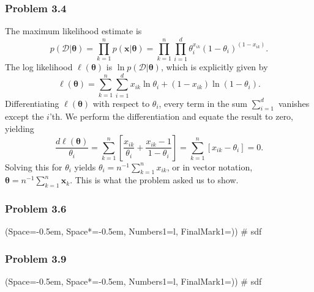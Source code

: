 \documentclass[12pt, a4paper]{article}
\newcommand{\listSpace}{-0.5em}%
\newcommand{\D}{\mathcal{D}}
\newcommand{\vect}[1]{\bm{#1}}
\begin{document}
\subsubsection*{Problem 3.4}
The maximum likelihood estimate is 
\begin{equation*}
	p( \D | \vect{\theta}) = \prod_{k = 1}^{n} p( \vect{x} | \vect{\theta}) = \prod_{k = 1}^{n} \prod_{i=1}^{d}
	\theta_{i}^{x_{ik}} \left( 1 - \theta_i \right)^{\left(  1 - x_{ik} \right)}.
\end{equation*}
 The log likelihood $\ell(\vect{\theta})$ is $ \ln p( \D | \vect{\theta}) $, which is explicitly given by
 \begin{equation*}
 	\ell(\vect{\theta}) = \sum_{k = 1}^{n} \sum_{i=1}^{d}
 	x_{ik} \ln \theta_i + (1 - x_{ik}) \ln \left( 1 - \theta_i\right).
 \end{equation*}
Differentiating $\ell(\vect{\theta})$ with respect to $\theta_i$, every term in the sum $\sum_{i=1}^{d}$ vanishes except the $i$'th.
We perform the differentiation and equate the result to zero, yielding
\begin{equation*}
	\frac{d \ell(\vect{\theta})}{\theta_i} = \sum_{k=1}^{n} \left[ \frac{x_{ik}}{\theta_i} + \frac{x_{ik} - 1}{1 - \theta_i} \right] =
	 \sum_{k=1}^{n} \left[ x_{ik} - \theta_i \right] = 0.
\end{equation*}
Solving this for $\theta_i$ yields $\theta_i = n^{-1} \sum_{k=1}^{n} x_{ik}$, or in vector notation, $\vect{\theta} = n^{-1} \sum_{k=1}^{n} \vect{x}_k$.
This is what the problem asked us to show.

\subsubsection*{Problem 3.6}
\begin{easylist}[enumerate]
	\ListProperties(Space=\listSpace, Space*=\listSpace, Numbers1=l, FinalMark1={)})
	# sdf
\end{easylist}

\subsubsection*{Problem 3.9}
\begin{easylist}[enumerate]
	\ListProperties(Space=\listSpace, Space*=\listSpace, Numbers1=l, FinalMark1={)})
	# sdf
\end{easylist}
\end{document}
